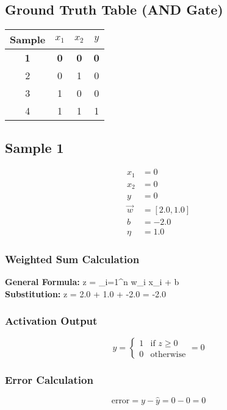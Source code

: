 \documentclass{article}
\begin{document}
\subsection*{Ground Truth Table (AND Gate)}
\begin{center}
\begin{tabular}{|c|c|c|c|}
\hline
\textbf{Sample} & $x_1$ & $x_2$ & $y$ \\
\hline
\rowcolor{yellow} \textbf{1} & \textbf{0} & \textbf{0} & \textbf{0} \\
\hline
2 & 0 & 1 & 0 \\
\hline
3 & 1 & 0 & 0 \\
\hline
4 & 1 & 1 & 1 \\
\hline
\end{tabular}
\end{center}

\subsection*{Sample 1}
\begin{align*}
x_1 &= 0 \\
x_2 &= 0 \\
y &= 0 \\
\vec{w} &= [2.0, 1.0] \\
b &= -2.0 \\
\eta &= 1.0
\end{align*}

\subsubsection*{Weighted Sum Calculation}
\textbf{General Formula:} \quad
z = \sum_{i=1}^{n} w_i x_i + b
\\
\textbf{Substitution:} \quad
z = 2.0  + 1.0  + -2.0 = -2.0

\subsubsection*{Activation Output}
\[
\hat{y} =
\begin{cases}
1 & \text{if } z \geq 0 \\
0 & \text{otherwise}
\end{cases}
= 0
\]

\subsubsection*{Error Calculation}
\[
\text{error} = y - \hat{y} = 0 - 0 = 0
\]
\end{document}
